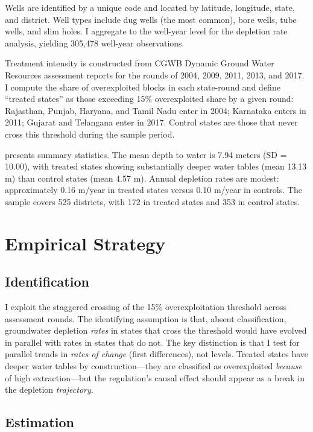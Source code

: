 \documentclass[12pt]{article}
\begin{document}
Wells are identified by a unique code and located by latitude, longitude, state, and district. Well types include dug wells (the most common), bore wells, tube wells, and slim holes. I aggregate to the well-year level for the depletion rate analysis, yielding 305,478 well-year observations.

Treatment intensity is constructed from CGWB Dynamic Ground Water Resources assessment reports for the rounds of 2004, 2009, 2011, 2013, and 2017. I compute the share of overexploited blocks in each state-round and define ``treated states'' as those exceeding 15\% overexploited share by a given round: Rajasthan, Punjab, Haryana, and Tamil Nadu enter in 2004; Karnataka enters in 2011; Gujarat and Telangana enter in 2017. Control states are those that never cross this threshold during the sample period.

 presents summary statistics. The mean depth to water is 7.94 meters (SD = 10.00), with treated states showing substantially deeper water tables (mean 13.13 m) than control states (mean 4.57 m). Annual depletion rates are modest: approximately 0.16 m/year in treated states versus 0.10 m/year in controls. The sample covers 525 districts, with 172 in treated states and 353 in control states.



\section{Empirical Strategy}

\subsection{Identification}

I exploit the staggered crossing of the 15\% overexploitation threshold across assessment rounds. The identifying assumption is that, absent classification, groundwater depletion \textit{rates} in states that cross the threshold would have evolved in parallel with rates in states that do not. The key distinction is that I test for parallel trends in \textit{rates of change} (first differences), not levels. Treated states have deeper water tables by construction---they are classified as overexploited \textit{because} of high extraction---but the regulation's causal effect should appear as a break in the depletion \textit{trajectory}.

\subsection{Estimation}
\end{document}
